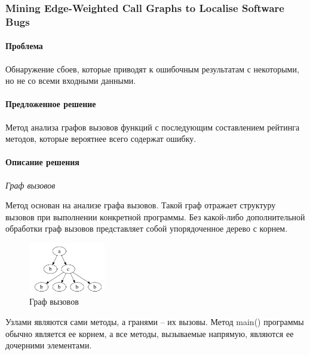 \def\notedate{2021.11.10}
\def\currentauthor{Крехтунова Д.Д. (РК6-73Б)}

\subsubsection{Mining Edge-Weighted Call Graphs to Localise Software Bugs}

\paragraph{Проблема}

Обнаружение сбоев, которые приводят к ошибочным результатам с некоторыми, но не со всеми входными данными.

\paragraph{Предложенное решение}

Метод анализа графов вызовов функций с последующим составлением рейтинга методов, которые вероятнее всего содержат ошибку. 

\paragraph{Описание решения}

\textit{Граф вызовов}

Метод основан на анализе графа вызовов. Такой граф отражает структуру вызовов при выполнении конкретной программы. Без какой-либо дополнительной обработки граф вызовов представляет собой упорядоченное дерево с корнем.

\begin{figure}[h]
	\centering
	\includegraphics[width=0.3\textwidth]{ResearchNotes/rndhpc_not_edt_2021_11_10/krekhtunova/graph.png}
	\caption{Граф вызовов} 
\end{figure}

Узлами являются сами методы, а гранями -- их вызовы. Метод main() программы обычно является ее корнем, а все методы, вызываемые напрямую, являются ее дочерними элементами.
\newline

